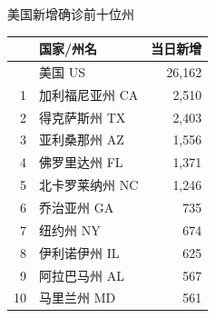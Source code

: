 \documentclass[
]{article}
\begin{document}
\begin{table}[H]
      \centering
    \begin{minipage}{.4\linewidth}
    \caption{美国新增确诊前十位州}
    \vspace{-0.5\baselineskip}
      \centering
    \captionsetup{justification=centering} \begin{table}[H]
\centering\begingroup\fontsize{12}{14}\selectfont

\begin{tabular}{rlr}
\toprule
  & 国家/州名 & 当日新增\\
\midrule
\rowcolor{gray!6}   & 美国 US & 26,162\\
1 & 加利福尼亚州 CA & 2,510\\
\rowcolor{gray!6}  2 & 得克萨斯州 TX & 2,403\\
3 & 亚利桑那州 AZ & 1,556\\
\rowcolor{gray!6}  4 & 佛罗里达州 FL & 1,371\\
5 & 北卡罗莱纳州 NC & 1,246\\
\rowcolor{gray!6}  6 & 乔治亚州 GA & 735\\
7 & 纽约州 NY & 674\\
\rowcolor{gray!6}  8 & 伊利诺伊州 IL & 625\\
9 & 阿拉巴马州 AL & 567\\
\rowcolor{gray!6}  10 & 马里兰州 MD & 561\\
\bottomrule
\end{tabular}
\endgroup{}
\end{table} \end{minipage}%
    \begin{minipage}{.6\linewidth}
     \caption{美国累计死亡前十位州}
     \vspace{-0.5\baselineskip}
      \centering
    \captionsetup{justification=centering} \begin{table}[H]
\centering\begingroup\fontsize{12}{14}\selectfont


\end{table}
\end{minipage}
\end{table}
\end{document}
